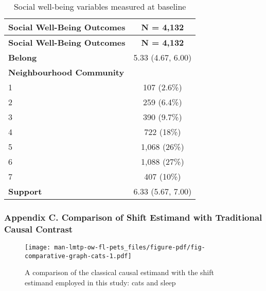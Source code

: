 \documentclass[
  singlecolumn,
  9pt]{article}
\begin{document}
\hypertarget{tbl-table_social_vars_dogs}{}
\begin{longtable}[]{@{}lc@{}}
\caption{\label{tbl-table_social_vars_dogs}Social well-being variables
measured at baseline}\tabularnewline
\toprule\noalign{}
\textbf{Social Well-Being Outcomes} & \textbf{N = 4,132} \\
\midrule\noalign{}
\endfirsthead
\toprule\noalign{}
\textbf{Social Well-Being Outcomes} & \textbf{N = 4,132} \\
\midrule\noalign{}
\endhead
\bottomrule\noalign{}
\endlastfoot
\textbf{Belong} & 5.33 (4.67, 6.00) \\
\textbf{Neighbourhood Community} & \\
1 & 107 (2.6\%) \\
2 & 259 (6.4\%) \\
3 & 390 (9.7\%) \\
4 & 722 (18\%) \\
5 & 1,068 (26\%) \\
6 & 1,088 (27\%) \\
7 & 407 (10\%) \\
\textbf{Support} & 6.33 (5.67, 7.00) \\
\end{longtable}

\subsubsection{Appendix C. Comparison of Shift Estimand with Traditional
Causal
Contrast}\label{appendix-c.-comparison-of-shift-estimand-with-traditional-causal-contrast}

\begin{figure}

{\centering \texttt{[image: man-lmtp-ow-fl-pets\_files/figure-pdf/fig-comparative-graph-cats-1.pdf]}

}

\caption{\label{fig-comparative-graph-cats}A comparison of the classical
causal estimand with the shift estimand employed in this study: cats and
sleep}

\end{figure}

\newpage{}
\end{document}
